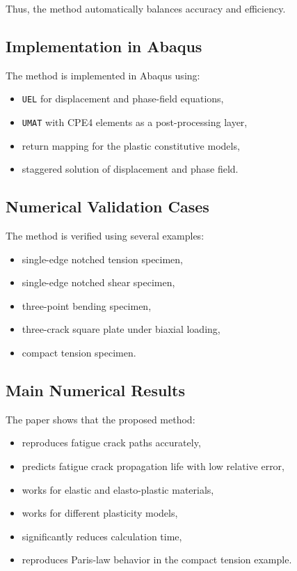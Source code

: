 ﻿\documentclass[11pt,a4paper]{article}
\begin{document}
Thus, the method automatically balances accuracy and efficiency.

\subsection{Implementation in Abaqus}

The method is implemented in Abaqus using:

\begin{itemize}[leftmargin=*]
    \item \texttt{UEL} for displacement and phase-field equations,
    \item \texttt{UMAT} with CPE4 elements as a post-processing layer,
    \item return mapping for the plastic constitutive models,
    \item staggered solution of displacement and phase field.
\end{itemize}

\subsection{Numerical Validation Cases}

The method is verified using several examples:

\begin{itemize}[leftmargin=*]
    \item single-edge notched tension specimen,
    \item single-edge notched shear specimen,
    \item three-point bending specimen,
    \item three-crack square plate under biaxial loading,
    \item compact tension specimen.
\end{itemize}

\subsection{Main Numerical Results}

The paper shows that the proposed method:

\begin{itemize}[leftmargin=*]
    \item reproduces fatigue crack paths accurately,
    \item predicts fatigue crack propagation life with low relative error,
    \item works for elastic and elasto-plastic materials,
    \item works for different plasticity models,
    \item significantly reduces calculation time,
    \item reproduces Paris-law behavior in the compact tension example.
\end{itemize}
\end{document}
